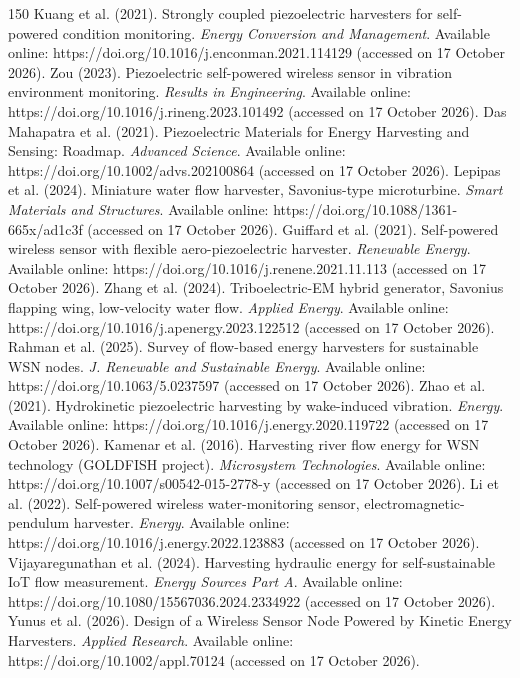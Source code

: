 \begin{thebibliography}{150}
Kuang et al. (2021). Strongly coupled piezoelectric harvesters for self-powered condition monitoring. \textit{Energy Conversion and Management}. Available online: https://doi.org/10.1016/j.enconman.2021.114129 (accessed on 17 October 2026).
Zou (2023). Piezoelectric self-powered wireless sensor in vibration environment monitoring. \textit{Results in Engineering}. Available online: https://doi.org/10.1016/j.rineng.2023.101492 (accessed on 17 October 2026).
Das Mahapatra et al. (2021). Piezoelectric Materials for Energy Harvesting and Sensing: Roadmap. \textit{Advanced Science}. Available online: https://doi.org/10.1002/advs.202100864 (accessed on 17 October 2026).
Lepipas et al. (2024). Miniature water flow harvester, Savonius-type microturbine. \textit{Smart Materials and Structures}. Available online: https://doi.org/10.1088/1361-665x/ad1c3f (accessed on 17 October 2026).
Guiffard et al. (2021). Self-powered wireless sensor with flexible aero-piezoelectric harvester. \textit{Renewable Energy}. Available online: https://doi.org/10.1016/j.renene.2021.11.113 (accessed on 17 October 2026).
Zhang et al. (2024). Triboelectric-EM hybrid generator, Savonius flapping wing, low-velocity water flow. \textit{Applied Energy}. Available online: https://doi.org/10.1016/j.apenergy.2023.122512 (accessed on 17 October 2026).
Rahman et al. (2025). Survey of flow-based energy harvesters for sustainable WSN nodes. \textit{J. Renewable and Sustainable Energy}. Available online: https://doi.org/10.1063/5.0237597 (accessed on 17 October 2026).
Zhao et al. (2021). Hydrokinetic piezoelectric harvesting by wake-induced vibration. \textit{Energy}. Available online: https://doi.org/10.1016/j.energy.2020.119722 (accessed on 17 October 2026).
Kamenar et al. (2016). Harvesting river flow energy for WSN technology (GOLDFISH project). \textit{Microsystem Technologies}. Available online: https://doi.org/10.1007/s00542-015-2778-y (accessed on 17 October 2026).
Li et al. (2022). Self-powered wireless water-monitoring sensor, electromagnetic-pendulum harvester. \textit{Energy}. Available online: https://doi.org/10.1016/j.energy.2022.123883 (accessed on 17 October 2026).
Vijayaregunathan et al. (2024). Harvesting hydraulic energy for self-sustainable IoT flow measurement. \textit{Energy Sources Part A}. Available online: https://doi.org/10.1080/15567036.2024.2334922 (accessed on 17 October 2026).
Yunus et al. (2026). Design of a Wireless Sensor Node Powered by Kinetic Energy Harvesters. \textit{Applied Research}. Available online: https://doi.org/10.1002/appl.70124 (accessed on 17 October 2026).

\end{thebibliography}
